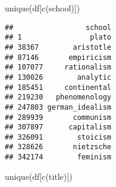 \documentclass[
]{article}
\newenvironment{Shaded}{\begin{snugshade}}{\end{snugshade}}
\newcommand{\FunctionTok}[1]{\textcolor[rgb]{0.00,0.00,0.00}{#1}}
\newcommand{\NormalTok}[1]{#1}
\newcommand{\StringTok}[1]{\textcolor[rgb]{0.31,0.60,0.02}{#1}}
\begin{document}
\begin{Shaded}
\begin{Highlighting}[]
\FunctionTok{unique}\NormalTok{(df[}\FunctionTok{c}\NormalTok{(}\StringTok{\textquotesingle{}school\textquotesingle{}}\NormalTok{)])}
\end{Highlighting}
\end{Shaded}

\begin{verbatim}
##                 school
## 1                plato
## 38367        aristotle
## 87146       empiricism
## 107077     rationalism
## 130026        analytic
## 185451     continental
## 219230   phenomenology
## 247803 german_idealism
## 289939       communism
## 307897      capitalism
## 326091        stoicism
## 328626       nietzsche
## 342174        feminism
\end{verbatim}

\begin{Shaded}
\begin{Highlighting}[]
\FunctionTok{unique}\NormalTok{(df[}\FunctionTok{c}\NormalTok{(}\StringTok{\textquotesingle{}title\textquotesingle{}}\NormalTok{)])}
\end{Highlighting}
\end{Shaded}
\end{document}

